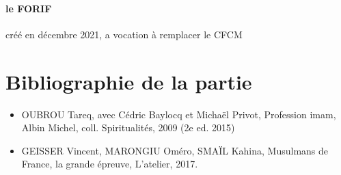 \paragraph{le FORIF}

\begin{Def}
créé en décembre 2021, a vocation à remplacer le CFCM 
\end{Def}




 

\section{Bibliographie de la partie}
\begin{itemize}
    \item OUBROU Tareq, avec Cédric Baylocq et Michaël Privot, Profession imam, Albin
Michel, coll. Spiritualités, 2009 (2e
ed. 2015)

\item GEISSER Vincent, MARONGIU Oméro, SMAÏL Kahina, Musulmans de France, la
grande épreuve, L’atelier, 2017.

\end{itemize}


 





